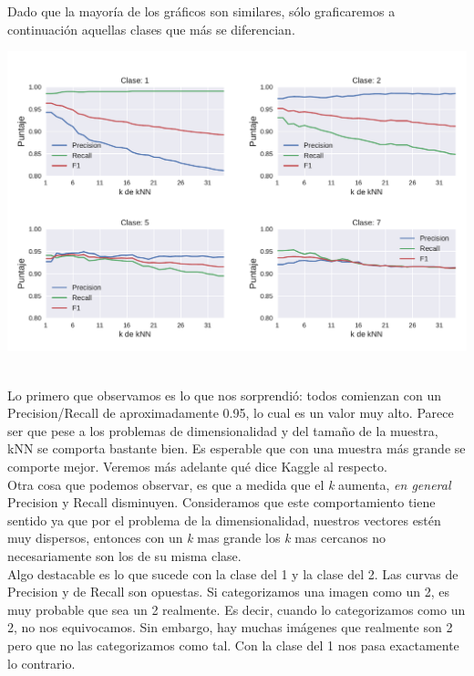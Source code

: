 Dado que la mayoría de los gráficos son similares, sólo graficaremos a continuación aquellas clases que más se diferencian.

{\centering
    \includegraphics[scale=0.70]{informe/imagenes/knn/precisionClase1257.pdf} \\
    \label{fig:knnclasesvariacion}
}
$ $\newline

Lo primero que observamos es lo que nos sorprendió: todos comienzan con un Precision/Recall de aproximadamente 0.95, lo cual es un valor muy alto. Parece ser que pese a los problemas de dimensionalidad y del tamaño de la muestra, kNN se comporta bastante bien. Es esperable que con una muestra más grande se comporte mejor. Veremos más adelante qué dice Kaggle al respecto.\\

Otra cosa que podemos observar, es que a medida que el \textit{k} aumenta, \textit{en general} Precision y Recall disminuyen. Consideramos que este comportamiento tiene sentido ya que por el problema de la dimensionalidad, nuestros vectores estén muy dispersos, entonces con un \textit{k} mas grande los \textit{k} mas cercanos no necesariamente son los de su misma clase. \\

Algo destacable es lo que sucede con la clase del 1 y la clase del 2. Las curvas de Precision y de Recall son opuestas. Si categorizamos una imagen como un 2, es muy probable que sea un 2 realmente. Es decir, cuando lo categorizamos como un 2, no nos equivocamos. Sin embargo, hay muchas imágenes que realmente son 2 pero que no las categorizamos como tal. Con la clase del 1 nos pasa exactamente lo contrario. \\

